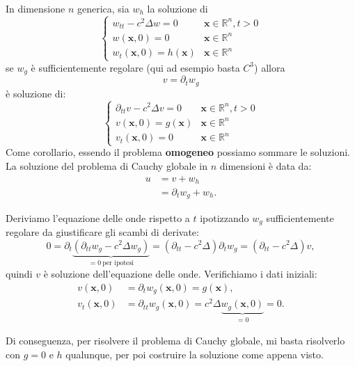 \documentclass[10pt,a4paper,twoside,openright]{book}
\newcommand{\x}{\mathbf{x}}
\begin{document}
\begin{theorem}
    [Lemma A] In dimensione $n$ generica, sia $w_{h}$ la soluzione di
    \begin{equation*}
        \begin{cases}
            w_{tt} -c^{2} \Delta w=0 & \x \in \mathbb{R}^{n} ,t >0 \\
            w(\x ,0) =0               & \x \in \mathbb{R}^{n}       \\
            w_{t}(\x ,0) =h(\x)       & \x \in \mathbb{R}^{n}
        \end{cases}
    \end{equation*}
    se $w_{g}$ è sufficientemente regolare (qui ad esempio basta $C^{3}$) allora
    \begin{equation*}
        v=\partial _{t} w_{g}
    \end{equation*}
    è soluzione di:
    \begin{equation*}
        \begin{cases}
            \partial _{tt} v-c^{2} \Delta v=0 & \x \in \mathbb{R}^{n} ,t >0 \\
            v(\x ,0) =g(\x)                   & \x \in \mathbb{R}^{n}       \\
            v_{t}(\x ,0) =0                   & \x \in \mathbb{R}^{n}
        \end{cases}
    \end{equation*}
    Come corollario, essendo il problema \textbf{omogeneo} possiamo sommare le soluzioni. La soluzione del problema di Cauchy globale in $n$ dimensioni è data da:
    \begin{align*}
        u & =v+w_{h}                     \\
          & =\partial _{t} w_{g} +w_{h}.
    \end{align*}
    \label{thm:lemma-A}
\end{theorem}
\begin{dimostrazione}
    Deriviamo l'equazione delle onde rispetto a $t$ ipotizzando $\displaystyle w_{g}$ sufficientemente regolare da giustificare gli scambi di derivate:
    \begin{equation*}
        0=\partial _{t}\underbrace{\left(\partial _{tt} w_{g} -c^{2} \Delta w_{g}\right)}_{=0\ \text{per ipotesi}} =\left(\partial _{tt} -c^{2} \Delta \right) \partial _{t} w_{g} =\left(\partial _{tt} -c^{2} \Delta \right) v,
    \end{equation*}
    quindi $v$ è soluzione dell'equazione delle onde. Verifichiamo i dati iniziali:
    \begin{align*}
        v(\x ,0)     & =\partial _{t} w_{g}(\x ,0) =g(\x) ,                                          \\
        v_{t}(\x ,0) & =\partial _{tt} w_{g}(\x ,0) =c^{2} \Delta \underbrace{w_{g}(\x ,0)}_{=0} =0.
    \end{align*}
\end{dimostrazione}
Di conseguenza, per risolvere il problema di Cauchy globale, mi basta risolverlo con $g=0$ e $h$ qualunque, per poi costruire la soluzione come appena visto.
\end{document}
